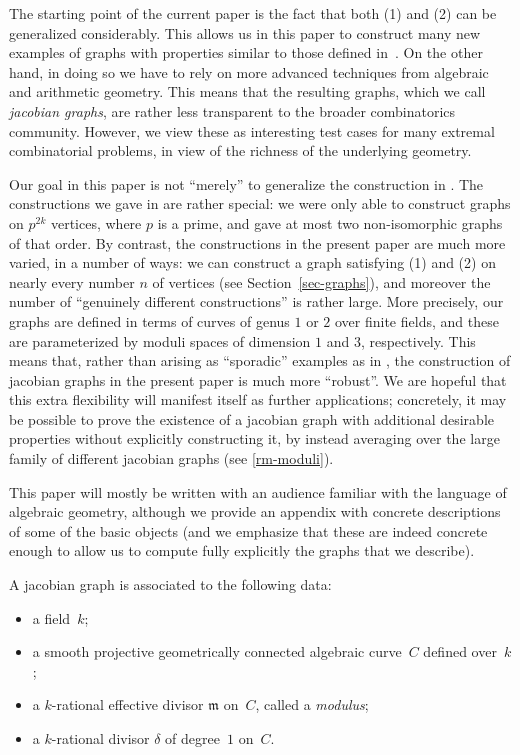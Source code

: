 \documentclass[12pt]{amsart}
\numberwithin{equation}{section}
\newcommand{\mfm}{\mathfrak{m}}
\theoremstyle{plain}
\theoremstyle{remark}
\theoremstyle{definition}
\begin{document}
The starting point of the current paper is the fact that both (1) and
(2) can be generalized considerably.  This allows us in this paper to
construct many new examples of graphs with properties similar to those
defined in~\cite{short}.  On the other hand, in doing so we have to rely
on more advanced techniques from algebraic and arithmetic
geometry. This means that the resulting graphs, which we call
\emph{jacobian graphs}, are rather less transparent to the broader
combinatorics community. However, we view these as interesting test
cases for many extremal combinatorial problems, in view of the richness
of the underlying geometry.

Our goal in this paper is not ``merely'' to generalize the construction in \cite{short}. The constructions we gave in \cite{short} are rather special: we were only able to construct graphs on $p^{2k}$ vertices, where $p$ is a prime, and gave at most two non-isomorphic graphs of that order. By contrast, the constructions in the present paper are much more varied, in a number of ways: we can construct a graph satisfying (1) and (2) on nearly every number $n$ of vertices (see Section~\ref{sec-graphs}), and moreover the number of ``genuinely different constructions'' is rather large. More precisely, our graphs are defined in terms of curves of genus $1$ or $2$ over finite fields, and these are parameterized by moduli spaces of dimension $1$ and $3$, respectively. This means that, rather than arising as ``sporadic'' examples as in \cite{short}, the construction of jacobian graphs in the present paper is much more ``robust''. We are hopeful that this extra flexibility will manifest itself as further applications; concretely, it may be possible to prove the existence of a jacobian graph with additional desirable properties without explicitly constructing it, by instead averaging over the large family of different jacobian graphs (see \cref{rm-moduli}). 

This paper will mostly be written with an audience familiar with the
language of algebraic geometry, although we provide an appendix with
concrete descriptions of some of the basic objects (and we emphasize
that these are indeed concrete enough to allow us to compute fully
explicitly the graphs that we describe).

A jacobian graph is associated to the following data:
\begin{itemize}
\item a field~$k$; 
\item a smooth projective geometrically connected algebraic curve~$C$
  defined over~$k$; 
\item a $k$-rational effective divisor $\mfm$ on~$C$, called a
  \emph{modulus}; 
\item a $k$-rational divisor $\delta$ of degree~$1$ on~$C$.
\end{itemize}
\end{document}
